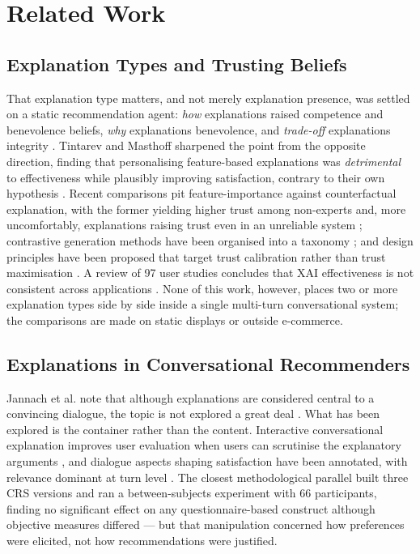 \documentclass[conference]{IEEEtran}
\begin{document}
\section{Related Work}
\label{sec:related}

\subsection{Explanation Types and Trusting Beliefs}

That explanation type matters, and not merely explanation presence, was settled on a static
recommendation agent: \textit{how} explanations raised competence and benevolence beliefs,
\textit{why} explanations benevolence, and \textit{trade-off} explanations integrity
\cite{wang2007}. Tintarev and Masthoff sharpened the point from the opposite direction,
finding that personalising feature-based explanations was \textit{detrimental} to
effectiveness while plausibly improving satisfaction, contrary to their own hypothesis
\cite{tintarev2012}. Recent comparisons pit feature-importance against counterfactual
explanation, with the former yielding higher trust among non-experts and, more
uncomfortably, explanations raising trust even in an unreliable system \cite{brito2023};
contrastive generation methods have been organised into a taxonomy \cite{stepin2021}; and
design principles have been proposed that target trust calibration rather than trust
maximisation \cite{naiseh2021}. A review of 97 user studies concludes that XAI
effectiveness is not consistent across applications \cite{rong2024}. None of this work,
however, places two or more explanation types side by side inside a single multi-turn
conversational system; the comparisons are made on static displays or outside e-commerce.

\subsection{Explanations in Conversational Recommenders}

Jannach et al. note that although explanations are considered central to a convincing
dialogue, the topic is not explored a great deal \cite{jannach2021}. What has been explored
is the container rather than the content. Interactive conversational explanation improves
user evaluation when users can scrutinise the explanatory arguments \cite{ziegler2023}, and
dialogue aspects shaping satisfaction have been annotated, with relevance dominant at turn
level \cite{siro2023}. The closest methodological parallel built three CRS versions and ran
a between-subjects experiment with 66 participants, finding no significant effect on any
questionnaire-based construct although objective measures differed \cite{ziegfeld2025} ---
but that manipulation concerned how preferences were elicited, not how recommendations were
justified.
\end{document}

